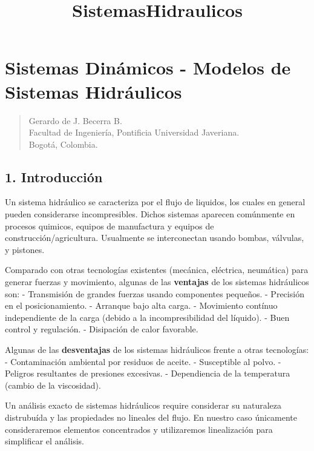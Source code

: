 \documentclass[11pt]{article}
\title{SistemasHidraulicos}
\begin{document}
    
    
    \maketitle
    
    

    
    \section{Sistemas Dinámicos - Modelos de Sistemas
Hidráulicos}\label{sistemas-dinuxe1micos---modelos-de-sistemas-hidruxe1ulicos}

\begin{quote}
Gerardo de J. Becerra B.\\
Facultad de Ingeniería, Pontificia Universidad Javeriana.\\
Bogotá, Colombia.
\end{quote}

    \subsection{1. Introducción}\label{introducciuxf3n}

Un sistema hidráulico se caracteriza por el flujo de liquidos, los
cuales en general pueden considerarse incompresibles. Dichos sistemas
aparecen comúnmente en procesos quimicos, equipos de manufactura y
equipos de construcción/agricultura. Usualmente se interconectan usando
bombas, válvulas, y pistones.

Comparado con otras tecnologías existentes (mecánica, eléctrica,
neumática) para generar fuerzas y movimiento, algunas de las
\textbf{ventajas} de los sistemas hidráulicos son: - Transmisión de
grandes fuerzas usando componentes pequeños. - Precisión en el
posicionamiento. - Arranque bajo alta carga. - Movimiento contínuo
independiente de la carga (debido a la incompresibilidad del líquido). -
Buen control y regulación. - Disipación de calor favorable.

Algunas de las \textbf{desventajas} de los sistemas hidráulicos frente a
otras tecnologías: - Contaminación ambiental por residuos de aceite. -
Susceptible al polvo. - Peligros resultantes de presiones excesivas. -
Dependiencia de la temperatura (cambio de la viscosidad).

Un análisis exacto de sistemas hidráulicos require considerar su
naturaleza distrubuída y las propiedades no lineales del flujo. En
nuestro caso únicamente consideraremos elementos concentrados y
utilizaremos linealización para simplificar el análisis.
\end{document}
